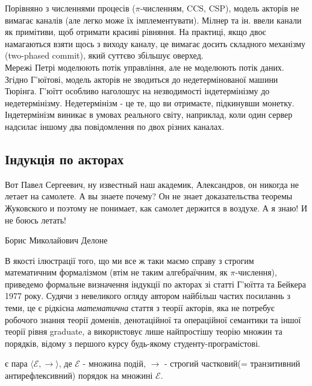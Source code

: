 \documentclass[12pt]{article}
\begin{document}
Порівняно з численнями процесів ($\pi$-численням, CCS, CSP), модель акторів не вимагає каналів (але легко може їх імплементувати). Мілнер та ін. ввели канали як примітиви, щоб отримати красиві рівняння. На практиці, якщо двоє намагаються взяти щось з виходу каналу, це вимагає досить складного механізму (two-phased commit), який суттєво збільшує оверхед.\\

Мережі Петрі моделюють потік управління, але не моделюють потік даних.\\

Згідно Г'юїтові, модель акторів не зводиться до недетермінованої машини Тюрінга. Г'юїтт особливо наголошує на незводимості індетермінізму до недетермінізму. Недетермінізм - це те, що ви отримаєте, підкинувши монетку. Індетермінізм виникає в умовах реального світу, наприклад, коли один сервер надсилає іншому два повідомлення по двох різних каналах.\\

\subsection{Індукція по акторах}

\epigraph{Вот Павел Сергеевич, ну известный наш академик, Александров, он никогда не летает на самолете. А вы знаете почему? Он не знает доказательства теоремы Жуковского и поэтому не понимает, как самолет держится в воздухе. А я знаю! И не боюсь летать!}
{Борис Миколайович Делоне}


В якості ілюстрації того, що ми все ж таки маємо справу з строгим математичним формалізмом (втім не таким алгебраїчним, як $\pi$-числення), приведемо формальне визначення індукції по акторах зі статті\cite{actorLaws} Г'юїтта та Бейкера 1977 року. Судячи з невеликого огляду автором найбільш частих посиланнь з теми, це є рідкісна \textit{математична} стаття з теорії акторів, яка не потребує робочого знання теорії доменів, денотаційної та операційної семантики та іншої теорії рівня graduate, а використовує лише найпростішу теорію множин та порядків, відому з першого курсу будь-якому студенту-програмістові. \\

\begin{definition}
є пара $\langle\mathcal{E}, \longrightarrow\rangle$, де $\mathcal{E}$ - множина подій, $\longrightarrow$ - строгий частковий(= транзитивний антирефлексивний) порядок на множині $\mathcal{E}$. 
\end{definition}
\end{document}
